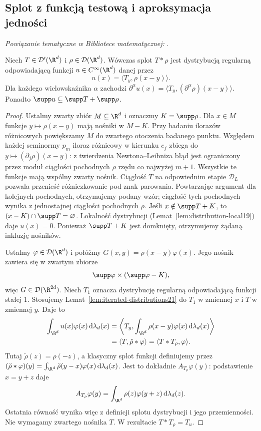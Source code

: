 \subsection{Splot z funkcją testową i aproksymacja jedności}

\noindent\emph{Powiązanie tematyczne w Bibliotece matematycznej:} .


\begin{twierdzenie}
\label{thm:smoothing21}
Niech $T\in\mathcal D'(\R^d)$ i
$\rho\in\mathcal D(\R^d)$. Wówczas splot
$T*\rho$ jest dystrybucją regularną odpowiadającą
funkcji $u\in C^\infty(\R^d)$ danej przez
\[
 u(x)=\langle T_y,\rho(x-y)\rangle.
\]
Dla każdego wielowskaźnika $\alpha$ zachodzi
$\partial^\alpha u(x)
=\langle T_y,(\partial^\alpha\rho)(x-y)\rangle$.
Ponadto $\supp u\subseteq\supp T+\supp\rho$.
\end{twierdzenie}
\begin{proof}
Ustalmy zwarty zbiór $M\subseteq\R^d$ i oznaczmy
$K=\supp\rho$. Dla $x\in M$ funkcje
$y\mapsto\rho(x-y)$ mają nośniki w $M-K$.
Przy badaniu ilorazów różnicowych powiększamy $M$
do zwartego otoczenia badanego punktu. Względem każdej
seminormy $p_m$ iloraz różnicowy w kierunku $e_j$
zbiega do $y\mapsto(\partial_j\rho)(x-y)$:
z twierdzenia Newtona--Leibniza błąd jest ograniczony
przez moduł ciągłości pochodnych $\rho$ rzędu co najwyżej
$m+1$. Wszystkie te funkcje mają wspólny zwarty nośnik.
Ciągłość $T$ na odpowiednim etapie $\mathcal D_L$
pozwala przenieść różniczkowanie pod znak parowania.
Powtarzając argument dla kolejnych pochodnych,
otrzymujemy podany wzór; ciągłość tych pochodnych
wynika z jednostajnej ciągłości pochodnych $\rho$.
Jeśli $x\notin\supp T+K$, to
$(x-K)\cap\supp T=\varnothing$. Lokalność dystrybucji
(Lemat~\ref{lem:distribution-local19}) daje $u(x)=0$.
Ponieważ $\supp T+K$ jest domknięty, otrzymujemy
żądaną inkluzję nośników.

Ustalmy $\varphi\in\mathcal D(\R^d)$ i połóżmy
$G(x,y)=\rho(x-y)\varphi(x)$. Jego nośnik zawiera się
w zwartym zbiorze
\[
 \supp\varphi\times(\supp\varphi-K),
\]
więc $G\in\mathcal D(\R^{2d})$.
Niech $T_1$ oznacza dystrybucję regularną odpowiadającą
funkcji stałej $1$. Stosujemy
Lemat~\ref{lem:iterated-distributions21} do $T_1$ w zmiennej
$x$ i $T$ w zmiennej $y$. Daje to
\[
 \begin{aligned}
 \int_{\R^d}u(x)\varphi(x)\,\mathrm d\lambda_d(x)
 &=\left\langle T_y,
      \int_{\R^d}\rho(x-y)\varphi(x)\,\mathrm d\lambda_d(x)
   \right\rangle\\
 &=\langle T,\check\rho*\varphi\rangle
 =\langle T* T_\rho,\varphi\rangle.
 \end{aligned}
\]
Tutaj $\check\rho(z)=\rho(-z)$, a klasyczny splot
funkcji definiujemy przez
$(\check\rho*\varphi)(y)=\int_{\R^d}\check\rho(y-x)
\varphi(x)\,\mathrm d\lambda_d(x)$.
Jest to dokładnie $A_{T_\rho}\varphi(y)$: podstawienie
$x=y+z$ daje
\[
 A_{T_\rho}\varphi(y)=
 \int_{\R^d}\rho(z)\varphi(y+z)\,\mathrm d\lambda_d(z).
\]
Ostatnia równość wynika więc z definicji splotu
dystrybucji i jego przemienności. Nie wymagamy
zwartego nośnika $T$. W rezultacie $T*T_\rho=T_u$.
\end{proof}

